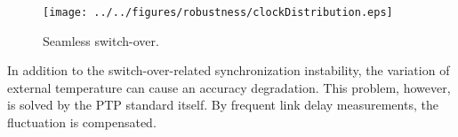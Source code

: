 \begin{figure}[t]
\centering
\texttt{[image: ../../figures/robustness/clockDistribution.eps]}
\caption{Seamless switch-over.}
\label{fig:switch-over}
\end{figure}

In addition to the switch-over-related synchronization instability, the variation of external temperature 
can cause an accuracy degradation. This problem, however, is solved by the PTP standard itself. By 
frequent link delay measurements, the fluctuation is compensated. 

